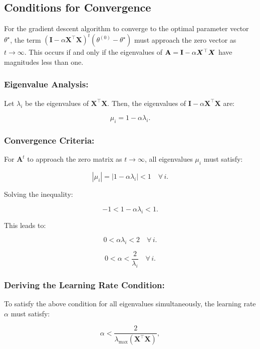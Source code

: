 \subsection{Conditions for Convergence}

For the gradient descent algorithm to converge to the optimal parameter vector \(\theta^\star\), the term \((\mathbf{I} - \alpha \boldsymbol{X}^\top \boldsymbol{X})^t (\theta^{(0)} - \theta^\star)\) must approach the zero vector as \(t \to \infty\). This occurs if and only if the eigenvalues of \( \mathbf{A}=\mathbf{I} - \alpha \boldsymbol{X}^\top \boldsymbol{X}\) have magnitudes less than one.

\subsubsection{Eigenvalue Analysis:}

Let \(\lambda_i\) be the eigenvalues of \(\boldsymbol{X}^\top \boldsymbol{X}\). Then, the eigenvalues of \(\mathbf{I} - \alpha \boldsymbol{X}^\top \boldsymbol{X}\) are:

\[
    \mu_i = 1 - \alpha \lambda_i.
\]

\subsubsection{Convergence Criteria:}

For \(\mathbf{A}^t\) to approach the zero matrix as \(t \to \infty\), all eigenvalues \(\mu_i\) must satisfy:

\[
    |\mu_i| = |1 - \alpha \lambda_i| < 1 \quad \forall \, i.
\]

Solving the inequality:

\[
    -1 < 1 - \alpha \lambda_i < 1.
\]

This leads to:

\[
    0 < \alpha \lambda_i < 2 \quad \forall \, i.
\]

\[
    0 < \alpha < \frac{2}{\lambda_i} \quad \forall \, i.
\]

\subsubsection{Deriving the Learning Rate Condition:}

To satisfy the above condition for all eigenvalues simultaneously, the learning rate \(\alpha\) must satisfy:

\[
    \alpha < \frac{2}{\lambda_{\max}(\boldsymbol{X}^\top \boldsymbol{X})},
\]


